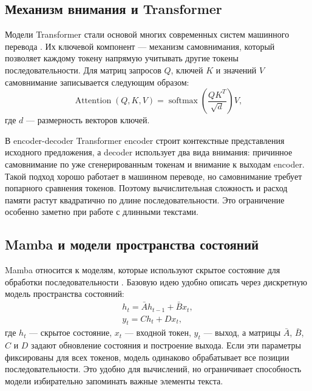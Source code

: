 \subsection{Механизм внимания и Transformer}

Модели Transformer стали основой многих современных систем машинного перевода \cite{transformer}.
Их ключевой компонент --- механизм самовнимания, который позволяет каждому токену напрямую учитывать другие токены последовательности.
Для матриц запросов $Q$, ключей $K$ и значений $V$ самовнимание записывается следующим образом:
\begin{equation}
    \operatorname{Attention}(Q, K, V) =
    \operatorname{softmax}\left(\frac{QK^T}{\sqrt{d}}\right)V,
\end{equation}
где $d$ --- размерность векторов ключей.

В encoder-decoder Transformer encoder строит контекстные представления исходного предложения, а decoder использует два вида внимания: причинное самовнимание по уже сгенерированным токенам и внимание к выходам encoder.
Такой подход хорошо работает в машинном переводе, но самовнимание требует попарного сравнения токенов.
Поэтому вычислительная сложность и расход памяти растут квадратично по длине последовательности.
Это ограничение особенно заметно при работе с длинными текстами.

\subsection{Mamba и модели пространства состояний}

Mamba относится к моделям, которые используют скрытое состояние для обработки последовательности \cite{mamba}.
Базовую идею удобно описать через дискретную модель пространства состояний:
\begin{equation}
    \begin{gathered}
        h_t = \bar{A}h_{t-1} + \bar{B}x_t, \\
        y_t = Ch_t + Dx_t,
    \end{gathered}
\end{equation}
где $h_t$ --- скрытое состояние, $x_t$ --- входной токен, $y_t$ --- выход, а матрицы $\bar{A}$, $\bar{B}$, $C$ и $D$ задают обновление состояния и построение выхода.
Если эти параметры фиксированы для всех токенов, модель одинаково обрабатывает все позиции последовательности.
Это удобно для вычислений, но ограничивает способность модели избирательно запоминать важные элементы текста.

